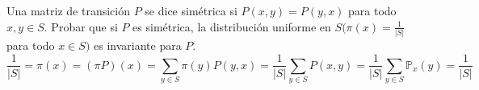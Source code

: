 \begin{ejercicio}{6}{
	Una matriz de transici\'on $P$ se dice sim\'etrica si $P (x, y) = P (y, x)$ para todo $x, y \in S$. Probar que si $P$ es sim\'etrica, la distribuci\'on uniforme en $S (\pi(x) = \frac{1}{|S|}$ para todo $x \in S)$ es invariante para $P$.
}{
	$$
	\frac{1}{|S|}
	= \pi(x)
	= (\pi P)(x)
	= \sum_{y \in S} \pi (y) P(y,x)
	= \frac{1}{|S|} \sum_{y \in S} P(x,y)
	= \frac{1}{|S|} \sum_{y \in S} \mathbb P_x(y)
	= \frac{1}{|S|}
	$$
}\end{ejercicio}